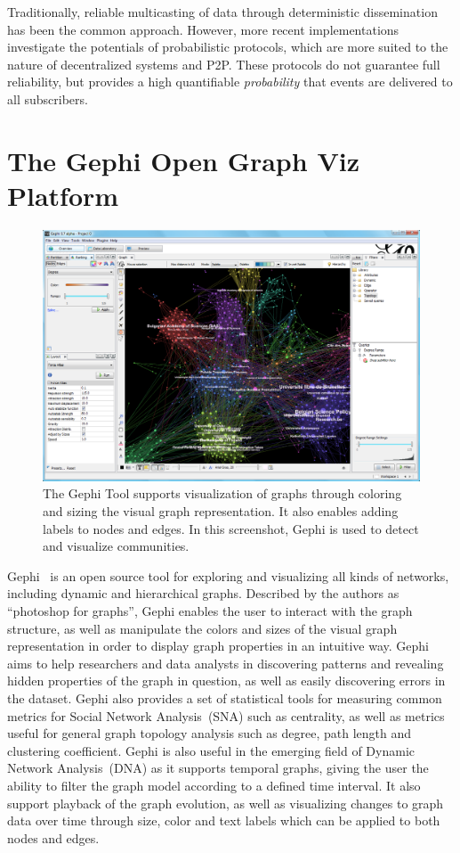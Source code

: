 Traditionally, reliable multicasting of data through deterministic
dissemination has been the common approach. However, more recent
implementations investigate the potentials of probabilistic protocols,
which are more suited to the nature of decentralized systems and P2P.
These protocols do not guarantee full reliability, but provides a high
quantifiable \emph{probability} that events are delivered to all
subscribers.


\section{The Gephi Open Graph Viz Platform}

\begin{figure}
    \centering
    \includegraphics[width=\textwidth]{img/gephi1}
    \caption{The Gephi Tool supports
        visualization of graphs through coloring and sizing the visual
        graph
        representation. It also enables adding labels to nodes and
        edges. In
        this screenshot, Gephi is used to detect and visualize
    communities.}
\label{img:gephi1}
\end{figure}

Gephi~\cite{ICWSM09154} is an open source tool for exploring and
visualizing all kinds of networks, including dynamic and hierarchical
graphs. Described by the authors as ``photoshop for graphs'', Gephi
enables the user to interact with the graph structure, as well as
manipulate the colors and sizes of the visual graph representation in
order to display graph properties in an intuitive way. Gephi aims to
help researchers and data analysts in discovering patterns and revealing
hidden properties of the graph in question, as well as easily
discovering errors in the dataset. Gephi also provides a set of
statistical tools for measuring common metrics for Social Network
Analysis~(SNA) such as centrality, as well as metrics useful for general
graph topology analysis such as degree, path length and clustering
coefficient. Gephi is also useful in the emerging field of Dynamic
Network Analysis~(DNA)  as it supports temporal graphs, giving the user
the ability to filter the graph model according to a defined time
interval. It also support playback of the graph evolution, as well as
visualizing changes to graph data over time through size, color and text
labels which can be applied to both nodes and edges.

